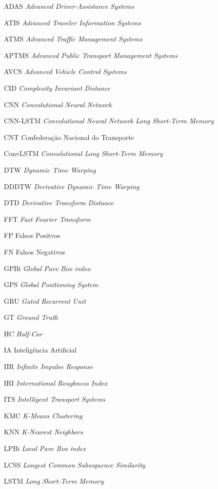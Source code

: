 \begin{siglas}
\item[ADAS] \textit{Advanced Driver-Assistance Systems}
\item[ATIS] \textit{Advanced Traveler Information Systems}
\item[ATMS] \textit{Advanced Traffic Management Systems}
\item[APTMS] \textit{Advanced Public Transport Management Systems}
\item[AVCS] \textit{Advanced Vehicle Control Systems}
\item[CID] \textit{Complexity Invariant Distance}
\item[CNN] \textit{Convolutional Neural Network}
\item[CNN-LSTM] \textit{Convolutional Neural Network Long Short-Term Memory}
\item[CNT] Confederação Nacional do Transporte
\item[ConvLSTM] \textit{Convolutional Long Short-Term Memory}
\item[DTW] \textit{Dynamic Time Warping}
\item[DDDTW] \textit{Derivative Dynamic Time Warping}
\item[DTD] \textit{Derivative Transform Distance}
\item[FFT] \textit{Fast Fourier Transform}
\item[FP] Falsos Positvos
\item[FN] Falsos Negativos
\item[GPBi] \textit{Global Pave Box index}
\item[GPS] \textit{Global Positioning System}
\item[GRU] \textit{Gated Recurrent Unit}
\item[GT] \textit{Ground Truth}
\item[HC] \textit{Half-Car}
\item[IA] Inteligência  Artificial
\item[IIR] \textit{Infinite Impulse Response}
\item[IRI] \textit{International Roughness Index}
\item[ITS] \textit{Intelligent Transport Systems}
\item[KMC] \textit{K-Means Clustering}
\item[KNN] \textit{K-Nearest Neighbors}
\item[LPBi] \textit{Local Pave Box index}
\item[LCSS] \textit{Longest Common Subsequence Similarity}
\item[LSTM] \textit{Long Short-Term Memory}

\end{siglas}
